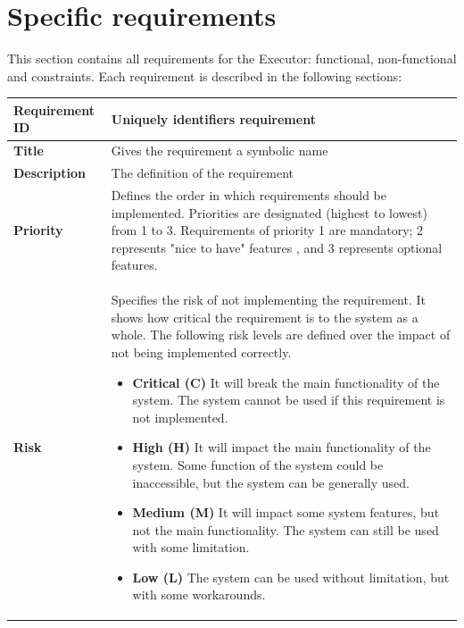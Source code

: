 \section{Specific requirements}
This section contains all requirements for the Executor: functional, non-functional and constraints. Each requirement is described in the following sections:
\begin{table}[ht]
  \begin{tabular}{|p{3.5cm}|p{8cm}|}
  \hline
    \textbf{Requirement ID}  & \begin{sloppypar}Uniquely identifiers requirement \end{sloppypar}\\
  \hline
    \textbf{Title}  & \begin{sloppypar}Gives the requirement a symbolic name\end{sloppypar}\\
  \hline
    \textbf{Description}  & \begin{sloppypar}The definition of the requirement\end{sloppypar}\\
  \hline
    \textbf{Priority}  & \begin{sloppypar}Defines the order in which requirements should be implemented. Priorities are designated (highest to lowest) from 1 to 3. Requirements of priority 1 are mandatory; 2 represents "nice to have" features , and 3 represents optional features.
    \end{sloppypar}\\
  \hline
    \textbf{Risk}  & \begin{sloppypar}
Specifies the risk of not implementing the requirement. It shows how critical the requirement is to the system as a whole. The following risk levels are defined over the impact of not being implemented correctly.
    \begin{itemize}
        \item \textbf{Critical (C)} It will break the main functionality of the system. The system cannot be used if this requirement is not implemented.
        \item \textbf{High (H)} It will impact the main functionality of the system. Some function of the system could be inaccessible, but the system can be generally used.
        \item \textbf{Medium (M)} It will impact some system features, but not the main functionality. The system can still be used with some limitation.
        \item \textbf{Low (L)} The system can be used without limitation, but with some workarounds.
    \end{itemize} \end{sloppypar}\\
  \hline
  \end{tabular}
\end{table}
\clearpage
